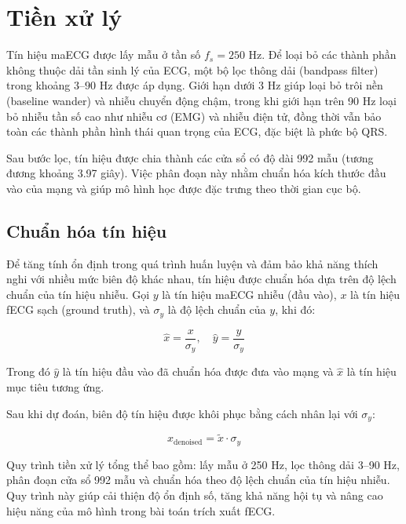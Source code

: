 \documentclass[../DoAn.tex]{subfiles}
\begin{document}
\section{Tiền xử lý}
\label{sec:preprocessing}

Tín hiệu maECG được lấy mẫu ở tần số $f_s = 250$ Hz. Để loại bỏ các thành phần không thuộc dải tần sinh lý của ECG, một bộ lọc thông dải (bandpass filter) trong khoảng $3$--$90$ Hz được áp dụng. Giới hạn dưới 3 Hz giúp loại bỏ trôi nền (baseline wander) và nhiễu chuyển động chậm, trong khi giới hạn trên 90 Hz loại bỏ nhiễu tần số cao như nhiễu cơ (EMG) và nhiễu điện tử, đồng thời vẫn bảo toàn các thành phần hình thái quan trọng của ECG, đặc biệt là phức bộ QRS.

Sau bước lọc, tín hiệu được chia thành các cửa sổ có độ dài 992 mẫu (tương đương khoảng 3.97 giây). Việc phân đoạn này nhằm chuẩn hóa kích thước đầu vào của mạng và giúp mô hình học được đặc trưng theo thời gian cục bộ.

\subsection{Chuẩn hóa tín hiệu}

Để tăng tính ổn định trong quá trình huấn luyện và đảm bảo khả năng thích nghi với nhiều mức biên độ khác nhau, tín hiệu được chuẩn hóa dựa trên độ lệch chuẩn của tín hiệu nhiễu. Gọi $y$ là tín hiệu maECG nhiễu (đầu vào), $x$ là tín hiệu fECG sạch (ground truth), và $\sigma_y$ là độ lệch chuẩn của $y$, khi đó:

\begin{equation}
  \hat{x} = \frac{x}{\sigma_y}, \quad
  \hat{y} = \frac{y}{\sigma_y}
\end{equation}

Trong đó $\hat{y}$ là tín hiệu đầu vào đã chuẩn hóa được đưa vào mạng và $\hat{x}$ là tín hiệu mục tiêu tương ứng.

Sau khi dự đoán, biên độ tín hiệu được khôi phục bằng cách nhân lại với $\sigma_y$:

\begin{equation}
  x_{\text{denoised}} = \tilde{x} \cdot \sigma_y
\end{equation}

Quy trình tiền xử lý tổng thể bao gồm: lấy mẫu ở 250 Hz, lọc thông dải 3--90 Hz, phân đoạn cửa sổ 992 mẫu và chuẩn hóa theo độ lệch chuẩn của tín hiệu nhiễu. Quy trình này giúp cải thiện độ ổn định số, tăng khả năng hội tụ và nâng cao hiệu năng của mô hình trong bài toán trích xuất fECG.
\end{document}
